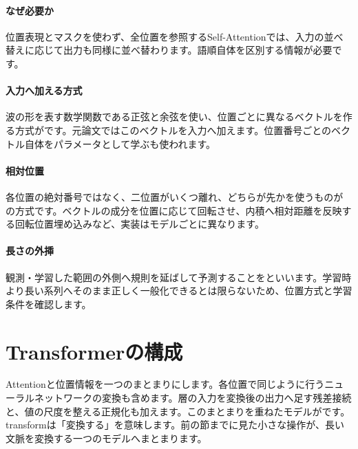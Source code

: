 \begingroup
\begingroup
\paragraph{なぜ必要か}
        位置表現とマスクを使わず、全位置を参照するSelf-Attentionでは、入力の並べ替えに応じて出力も同様に並べ替わります。語順自体を区別する情報が必要です。

\paragraph{入力へ加える方式}
        波の形を表す数学関数である正弦と余弦を使い、位置ごとに異なるベクトルを作る方式がです。元論文ではこのベクトルを入力へ加えます。位置番号ごとのベクトル自体をパラメータとして学ぶも使われます。

\par
\endgroup
\medskip
\begingroup
\paragraph{相対位置}
        各位置の絶対番号ではなく、二位置がいくつ離れ、どちらが先かを使うものがの方式です。ベクトルの成分を位置に応じて回転させ、内積へ相対距離を反映する回転位置埋め込みなど、実装はモデルごとに異なります。

\paragraph{長さの外挿}
        観測・学習した範囲の外側へ規則を延ばして予測することをといいます。学習時より長い系列へそのまま正しく一般化できるとは限らないため、位置方式と学習条件を確認します。

\par
\endgroup
\par
\endgroup


\section{Transformerの構成}
\label{sec:06-machine-learning-26}

Attentionと位置情報を一つのまとまりにします。各位置で同じように行うニューラルネットワークの変換も含めます。層の入力を変換後の出力へ足す残差接続と、値の尺度を整える正規化も加えます。このまとまりを重ねたモデルがです。transformは「変換する」を意味します。前の節までに見た小さな操作が、長い文脈を変換する一つのモデルへまとまります。

